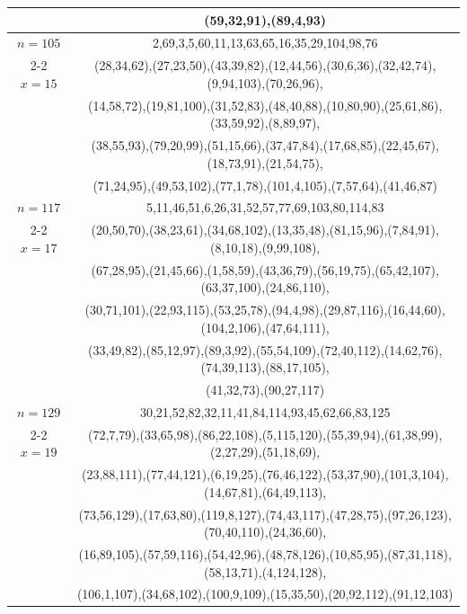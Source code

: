 \begin{tabular}{| c | c |}
&(59,32,91),(89,4,93)\\
\hline 
\(n=105\) & 
2,69,3,5,60,11,13,63,65,16,35,29,104,98,76\\
\cline{2-2}
\(x=15\)
&(28,34,62),(27,23,50),(43,39,82),(12,44,56),(30,6,36),(32,42,74),(9,94,103),(70,26,96),\\
&(14,58,72),(19,81,100),(31,52,83),(48,40,88),(10,80,90),(25,61,86),(33,59,92),(8,89,97),\\
&(38,55,93),(79,20,99),(51,15,66),(37,47,84),(17,68,85),(22,45,67),(18,73,91),(21,54,75),\\
&(71,24,95),(49,53,102),(77,1,78),(101,4,105),(7,57,64),(41,46,87)\\
\hline 
\(n=117\) & 
5,11,46,51,6,26,31,52,57,77,69,103,80,114,83\\
\cline{2-2}
\(x=17\)
&(20,50,70),(38,23,61),(34,68,102),(13,35,48),(81,15,96),(7,84,91),(8,10,18),(9,99,108),\\
&(67,28,95),(21,45,66),(1,58,59),(43,36,79),(56,19,75),(65,42,107),(63,37,100),(24,86,110),\\
&(30,71,101),(22,93,115),(53,25,78),(94,4,98),(29,87,116),(16,44,60),(104,2,106),(47,64,111),\\
&(33,49,82),(85,12,97),(89,3,92),(55,54,109),(72,40,112),(14,62,76),(74,39,113),(88,17,105),\\
&(41,32,73),(90,27,117)\\
\hline 
\(n=129\) & 
30,21,52,82,32,11,41,84,114,93,45,62,66,83,125\\
\cline{2-2}
\(x=19\)
&(72,7,79),(33,65,98),(86,22,108),(5,115,120),(55,39,94),(61,38,99),(2,27,29),(51,18,69),\\
&(23,88,111),(77,44,121),(6,19,25),(76,46,122),(53,37,90),(101,3,104),(14,67,81),(64,49,113),\\
&(73,56,129),(17,63,80),(119,8,127),(74,43,117),(47,28,75),(97,26,123),(70,40,110),(24,36,60),\\
&(16,89,105),(57,59,116),(54,42,96),(48,78,126),(10,85,95),(87,31,118),(58,13,71),(4,124,128),\\
&(106,1,107),(34,68,102),(100,9,109),(15,35,50),(20,92,112),(91,12,103)\\
\hline 
\end{tabular}